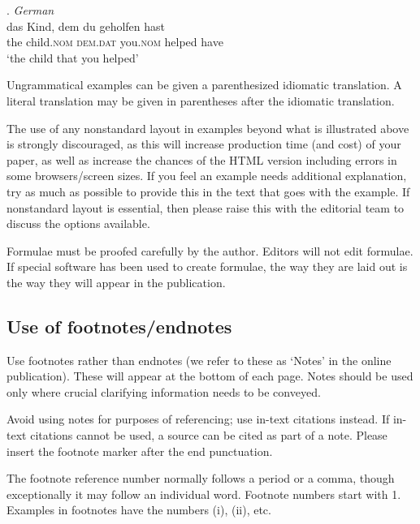\documentclass[]{glossa}
\begin{document}
\ex. \textit{German} \citep{coetsem:2000} \\
\gll das Kind, dem du geholfen hast\\  
the child.\textsc{nom} \textsc{dem.dat} you.\textsc{nom}  helped have\\ %
\glt `the child that you helped' %

Ungrammatical examples can be given a parenthesized idiomatic
translation. A literal translation may be given in parentheses after the
idiomatic translation.

The use of any nonstandard layout in examples beyond what is illustrated
above is strongly discouraged, as this will increase production time
(and cost) of your paper, as well as increase the chances of the HTML
version including errors in some browsers/screen sizes. If you feel an
example needs additional explanation, try as much as possible to provide
this in the text that goes with the example. If nonstandard layout is
essential, then please raise this with the editorial team to discuss the
options available.

Formulae must be proofed carefully by the author. Editors will not edit
formulae. If special software has been used to create formulae, the way
they are laid out is the way they will appear in the publication.

\hypertarget{fn}{%
\subsection{Use of footnotes/endnotes}\label{fn}}

Use footnotes rather than endnotes (we refer to these as `Notes' in the
online publication). These will appear at the bottom of each page. Notes
should be used only where crucial clarifying information needs to be
conveyed.

Avoid using notes for purposes of referencing; use in-text citations
instead. If in-text citations cannot be used, a source can be cited as
part of a note. Please insert the footnote marker after the end
punctuation.

The footnote reference number normally follows a period or a comma,
though exceptionally it may follow an individual word. Footnote numbers
start with 1. Examples in footnotes have the numbers (i), (ii), etc.
\end{document}
